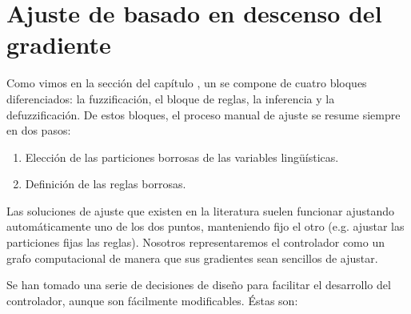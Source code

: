 \chapter{Ajuste de  basado en descenso del gradiente}
\label{ch:fuzzy-controller-adjustment}

Como vimos en la sección  del capítulo , un  se compone de cuatro bloques diferenciados: la fuzzificación, el bloque de reglas, la inferencia y la defuzzificación. De estos bloques, el proceso manual de ajuste se resume siempre en dos pasos:

\begin{enumerate}
	\item Elección de las particiones borrosas de las variables lingüísticas.
	\item Definición de las reglas borrosas.
\end{enumerate}

Las soluciones de ajuste que existen en la literatura suelen funcionar ajustando automáticamente uno de los dos puntos, manteniendo fijo el otro (e.g. ajustar las particiones fijas las reglas). Nosotros representaremos el controlador como un grafo computacional de manera que sus gradientes sean sencillos de ajustar.

Se han tomado una serie de decisiones de diseño para facilitar el desarrollo del controlador, aunque son fácilmente modificables. Éstas son:

